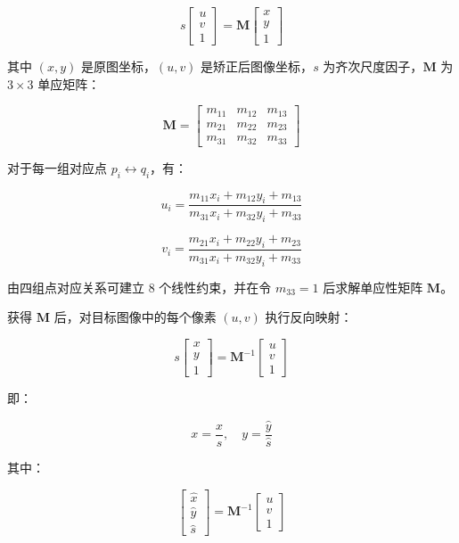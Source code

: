 \documentclass[letterpaper]{article}
\begin{document}
\[
s
\begin{bmatrix}
u\\
v\\
1
\end{bmatrix}
=
\mathbf{M}
\begin{bmatrix}
x\\
y\\
1
\end{bmatrix}
\]

其中 \((x,y)\) 是原图坐标，\((u,v)\) 是矫正后图像坐标，\(s\) 为齐次尺度因子，\(\mathbf{M}\) 为 \(3\times3\) 单应矩阵：

\[
\mathbf{M}=
\begin{bmatrix}
m_{11} & m_{12} & m_{13}\\
m_{21} & m_{22} & m_{23}\\
m_{31} & m_{32} & m_{33}
\end{bmatrix}
\]

对于每一组对应点 \(p_i \leftrightarrow q_i\)，有：

\[
u_i=\frac{m_{11}x_i+m_{12}y_i+m_{13}}
{m_{31}x_i+m_{32}y_i+m_{33}}
\]

\[
v_i=\frac{m_{21}x_i+m_{22}y_i+m_{23}}
{m_{31}x_i+m_{32}y_i+m_{33}}
\]

由四组点对应关系可建立 8 个线性约束，并在令 \(m_{33}=1\) 后求解单应性矩阵 \(\mathbf{M}\)。

获得 \(\mathbf{M}\) 后，对目标图像中的每个像素 \((u,v)\) 执行反向映射：

\[
s
\begin{bmatrix}
x\\
y\\
1
\end{bmatrix}
=
\mathbf{M}^{-1}
\begin{bmatrix}
u\\
v\\
1
\end{bmatrix}
\]

即：

\[
x=\frac{\hat{x}}{\hat{s}},\quad
y=\frac{\hat{y}}{\hat{s}}
\]

其中：

\[
\begin{bmatrix}
\hat{x}\\
\hat{y}\\
\hat{s}
\end{bmatrix}
=
\mathbf{M}^{-1}
\begin{bmatrix}
u\\
v\\
1
\end{bmatrix}
\]
\end{document}
